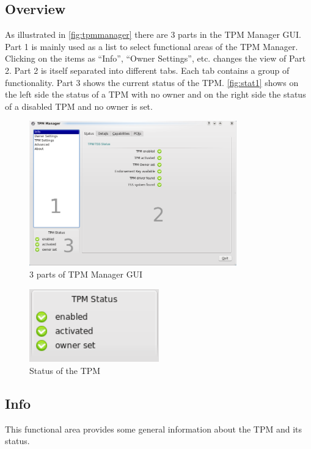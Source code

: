 \documentclass[
  american        %
]{sirrixreport}
\begin{document}
\subsection{Overview}
As illustrated in \autoref{fig:tpmmanager} there are 3 parts in the TPM Manager GUI. 
Part 1 is mainly used as a list to select functional areas of the TPM Manager. Clicking on the items as ``Info'', ``Owner Settings'', etc. changes the view of Part 2. Part 2 is itself separated into different tabs. Each tab contains a group of functionality. Part 3 shows the current status of the TPM. \autoref{fig:stat1} shows on the left side the status of a TPM with no owner and on the right side the status of a disabled TPM and no owner is set.

\begin{figure}[h]
 \centering
   \includegraphics[width=0.8\textwidth]{images/man_parts}
   \caption{3 parts of TPM Manager GUI}
\label{fig:tpmmanager}
\end{figure}
\begin{figure}[h]
 \centering
   \includegraphics[width=0.5\textwidth]{images/man_stat}\caption{Status of the TPM}\label{fig:stat1}
\label{fig:stat2}
\end{figure}
\clearpage

\subsection{Info} This functional area provides some general information about the TPM and its status.
\end{document}
